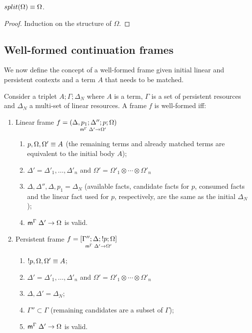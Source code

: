 \begin{theorem}
$\feq{split(\Omega)}{\Omega}$.
\end{theorem}
\begin{proof}
Induction on the structure of $\Omega$.
\end{proof}

\subsection{Well-formed continuation frames}

We now define the concept of a well-formed frame given initial linear and
persistent contexts and a term $A$ that needs to be matched.

\begin{definition}

Consider a triplet $A; \Gamma; \Delta_{N}$ where $A$ is a term, $\Gamma$ is a
set of persistent resources and $\Delta_{N}$ a multi-set of linear
resources. A frame $f$ is well-formed iff:

\begin{enumerate}[leftmargin=*]
   \item Linear frame $f = \lframe{\Delta,
      p_1}{\Delta''}{p}{\Omega}{\Delta'}{\Omega'}$

   \begin{enumerate}
      \item $\feq{p, \Omega, \Omega'}{A}$ (the remaining terms and already
               matched terms are equivalent to the initial body $A$);
      \item $\Delta' = \Delta'_1, \dotsc, \Delta'_n$ and $\Omega' =
      \Omega'_1 \otimes \dotsb \otimes \Omega'_n$
      \item $\Delta, \Delta'', \Delta, p_1 = \Delta_{N}$ (available facts, candidate
            facts for $p$, consumed facts and the linear fact used for $p$,
            respectively, are the same as the initial $\Delta_{N}$);
      \item $\mz{\Gamma}{\Delta'}{\Omega}$ is valid.

   \end{enumerate}
   \item Persistent frame $f = \pframe{\Gamma''}{\Delta}{\bang
   p}{\Omega}{\Delta'}{\Omega'}$
      \begin{enumerate}
         \item $\feq{\bang p, \Omega, \Omega'}{A}$;
         \item $\Delta' = \Delta'_1, \dotsc, \Delta'_n$ and $\Omega' =
         \Omega'_1 \otimes \dotsb \otimes \Omega'_n$
         \item $\Delta, \Delta' = \Delta_{N}$;
         \item $\Gamma'' \subset \Gamma$ (remaining candidates are a subset of
                     $\Gamma$);
         \item $\mz{\Gamma}{\Delta'}{\Omega}$ is valid.
      \end{enumerate}
\end{enumerate}
\end{definition}


